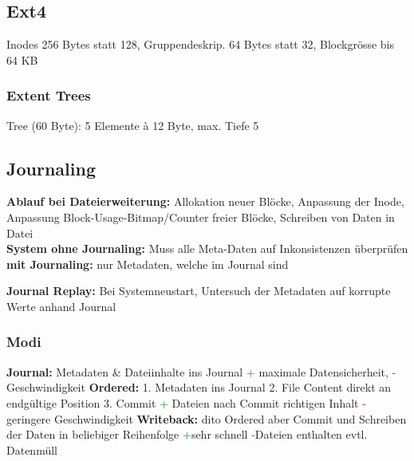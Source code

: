 \subsection{Ext4}
Inodes 256 Bytes statt 128, Gruppendeskrip. 64 Bytes statt 32, Blockgrösse bis 64 KB

\subsubsection{Extent Trees}
Tree (60 Byte): 5 Elemente à 12 Byte, max. Tiefe 5

\subsection{Journaling}
\textbf{Ablauf bei Dateierweiterung:} Allokation neuer Blöcke, Anpassung der Inode, Anpassung Block-Usage-Bitmap/Counter freier Blöcke, Schreiben von Daten in Datei\\
\textbf{System ohne Journaling:} Muss alle Meta-Daten auf Inkonsistenzen überprüfen
\textbf{mit Journaling:} nur Metadaten, welche im Journal sind

\textbf{Journal Replay:} Bei Systemneustart, Untersuch der Metadaten auf korrupte Werte anhand Journal

\subsubsection{Modi}
\textbf{Journal: }Metadaten \& Dateiinhalte ins Journal \textcolor{green}{+} maximale Datensicherheit, \textcolor{red}{-} Geschwindigkeit
\textbf{Ordered: }1. Metadaten ins Journal 2. File Content direkt an endgültige Position 3. Commit \textcolor{green}{+} Dateien nach Commit richtigen Inhalt \textcolor{red}{-} geringere Geschwindigkeit
\textbf{Writeback: }dito Ordered aber Commit und Schreiben der Daten in beliebiger Reihenfolge \textcolor{green}{+}sehr schnell \textcolor{red}{-}Dateien enthalten evtl. Datenmüll
